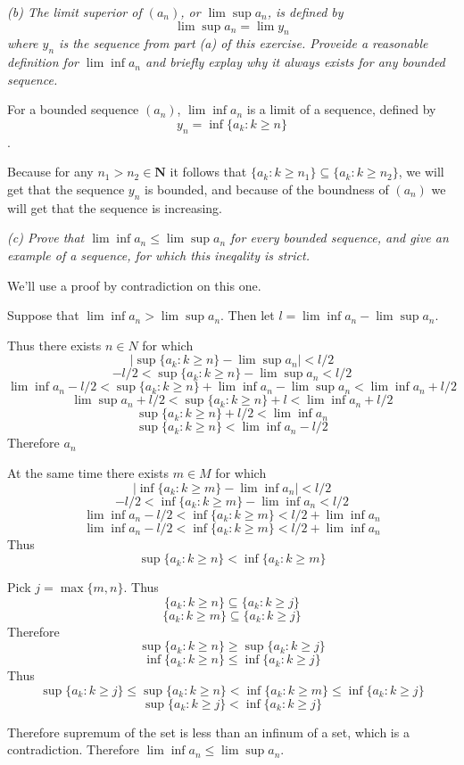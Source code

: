 \documentclass[11pt,oneside,titlepage]{book}
\begin{document}
\textit{(b) The limit superior of $(a_n)$, or $\lim\sup a_n$, is defined by}
$$\lim \sup a_n = \lim y_n$$
\textit{where $y_n$ is the sequence from part (a) of this exercise. Proveide
  a reasonable definition for $\lim\inf a_n$ and briefly explay why it always
  exists for any bounded sequence.}

For a bounded sequence $(a_n)$, $\lim\inf a_n$ is a limit of a sequence,
defined by
$$y_n = \inf\{a_k: k \geq n\}$$.

Because for any $n_1 > n_2 \in \textbf{N}$ it follows that
$\{a_k: k \geq n_1\} \subseteq \{a_k: k \geq n_2\}$, we
will get that the sequence $y_n$ is bounded, and because of the
boundness of $(a_n)$ we will get that the sequence is increasing.

\textit {(c) Prove that $\lim\inf a_n \leq \lim \sup a_n$ for every bounded
  sequence, and give an example of a sequence, for which this ineqality is
  strict.}

We'll use a proof by contradiction on this one.

Suppose that $\lim\inf a_n > \lim \sup a_n$. Then let $l = \lim\inf a_n -
\lim \sup a_n$.

Thus there exists $n \in N$ for which
$$|\sup\{a_k: k \geq n\} - \lim\sup a_n| < l/2$$
$$-l/2 < \sup\{a_k: k \geq n\} - \lim\sup a_n < l/2$$
$$ \lim\inf a_n - l/2 < \sup\{a_k: k \geq n\} + \lim\inf a_n - \lim\sup a_n <\lim\inf a_n +  l/2$$
$$ \lim\sup a_n + l/2 < \sup\{a_k: k \geq n\} + l < \lim\inf a_n + l/2$$
$$  \sup\{a_k: k \geq n\} + l/2 < \lim\inf a_n $$
$$  \sup\{a_k: k \geq n\} < \lim\inf a_n - l/2$$
Therefore $a_n $

At the same time there exists $m \in M$ for which
$$|\inf\{a_k: k \geq m\} - \lim\inf a_n| < l/2$$
$$-l/2 < \inf\{a_k: k \geq m\} - \lim\inf a_n < l/2$$
$$\lim\inf a_n -l/2 < \inf\{a_k: k \geq m\}  < l/2 + \lim\inf a_n$$
$$\lim\inf a_n - l/2 < \inf\{a_k: k \geq m\}  <  l/2 + \lim\inf a_n$$
Thus
$$  \sup\{a_k: k \geq n\} < \inf\{a_k: k \geq m\}$$

Pick $j = \max\{m, n\}$.  Thus 
$$\{a_k: k \geq n\} \subseteq \{a_k: k \geq j\}$$
$$\{a_k: k \geq m\} \subseteq \{a_k: k \geq j\}$$
Therefore
$$ \sup\{a_k: k \geq n\} \geq \sup \{a_k: k \geq j\}$$
$$ \inf\{a_k: k \geq n\} \leq \inf \{a_k: k \geq j\}$$
Thus 
$$ \sup \{a_k: k \geq j\} \leq \sup\{a_k: k \geq n\} < \inf\{a_k: k \geq m\}
\leq \inf \{a_k: k \geq j\} $$
$$ \sup \{a_k: k \geq j\} <  \inf \{a_k: k \geq j\} $$

Therefore supremum of the set is less than an infinum of a set, which is
a contradiction. Therefore $\lim\inf a_n \leq \lim \sup a_n$.
\end{document}
